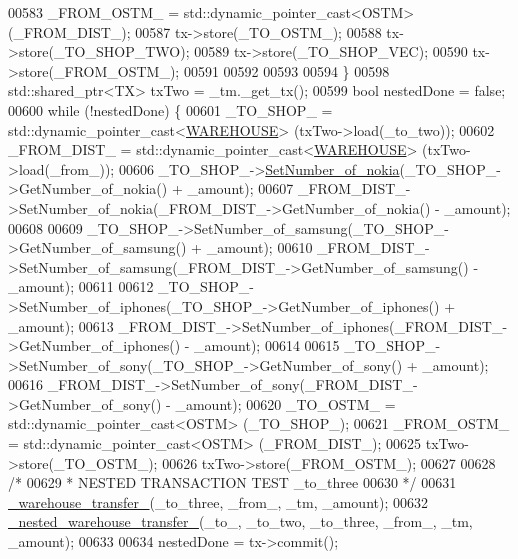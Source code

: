 \begin{DoxyCode}
00583                 \_FROM\_OSTM\_ = std::dynamic\_pointer\_cast<OSTM> (\_FROM\_DIST\_);
00587                 tx->store(\_TO\_OSTM\_);
00588                 tx->store(\_TO\_SHOP\_TWO);
00589                 tx->store(\_TO\_SHOP\_VEC);
00590                 tx->store(\_FROM\_OSTM\_);
00591 
00592 
00593 
00594             \}
00598             std::shared\_ptr<TX> txTwo = \_tm.\_get\_tx();
00599             \textcolor{keywordtype}{bool} nestedDone = \textcolor{keyword}{false};
00600             \textcolor{keywordflow}{while} (!nestedDone) \{
00601                 \_TO\_SHOP\_ = std::dynamic\_pointer\_cast<\hyperlink{class_w_a_r_e_h_o_u_s_e}{WAREHOUSE}> (txTwo->load(\_to\_two));
00602                 \_FROM\_DIST\_ = std::dynamic\_pointer\_cast<\hyperlink{class_w_a_r_e_h_o_u_s_e}{WAREHOUSE}> (txTwo->load(\_from\_));
00606                 \_TO\_SHOP\_->\hyperlink{class_w_a_r_e_h_o_u_s_e_a13ace834a25aab61c689a7cedad94343}{SetNumber\_of\_nokia}(\_TO\_SHOP\_->GetNumber\_of\_nokia() + \_amount);
00607                 \_FROM\_DIST\_->SetNumber\_of\_nokia(\_FROM\_DIST\_->GetNumber\_of\_nokia() - \_amount);
00608 
00609                 \_TO\_SHOP\_->SetNumber\_of\_samsung(\_TO\_SHOP\_->GetNumber\_of\_samsung() + \_amount);
00610                 \_FROM\_DIST\_->SetNumber\_of\_samsung(\_FROM\_DIST\_->GetNumber\_of\_samsung() - \_amount);
00611 
00612                 \_TO\_SHOP\_->SetNumber\_of\_iphones(\_TO\_SHOP\_->GetNumber\_of\_iphones() + \_amount);
00613                 \_FROM\_DIST\_->SetNumber\_of\_iphones(\_FROM\_DIST\_->GetNumber\_of\_iphones() - \_amount);
00614 
00615                 \_TO\_SHOP\_->SetNumber\_of\_sony(\_TO\_SHOP\_->GetNumber\_of\_sony() + \_amount);
00616                 \_FROM\_DIST\_->SetNumber\_of\_sony(\_FROM\_DIST\_->GetNumber\_of\_sony() - \_amount);
00620                 \_TO\_OSTM\_ = std::dynamic\_pointer\_cast<OSTM> (\_TO\_SHOP\_);
00621                 \_FROM\_OSTM\_ = std::dynamic\_pointer\_cast<OSTM> (\_FROM\_DIST\_);
00625                 txTwo->store(\_TO\_OSTM\_);
00626                 txTwo->store(\_FROM\_OSTM\_);
00627 
00628                 \textcolor{comment}{/*}
00629 \textcolor{comment}{                 * NESTED TRANSACTION TEST \_to\_three}
00630 \textcolor{comment}{                 */}
00631                 \hyperlink{main_8cpp_a1c170f18aac9dbb8aba1ad2f7e4619cc}{\_warehouse\_transfer\_}(\_to\_three, \_from\_, \_tm, \_amount);
00632                 \hyperlink{main_8cpp_a52fcb0d50c67be8cd20f2aca338683c7}{\_nested\_warehouse\_transfer\_}(\_to\_, \_to\_two, \_to\_three, \_from\_, 
      \_tm, \_amount);
00633 
00634                 nestedDone = tx->commit();

\end{DoxyCode}
